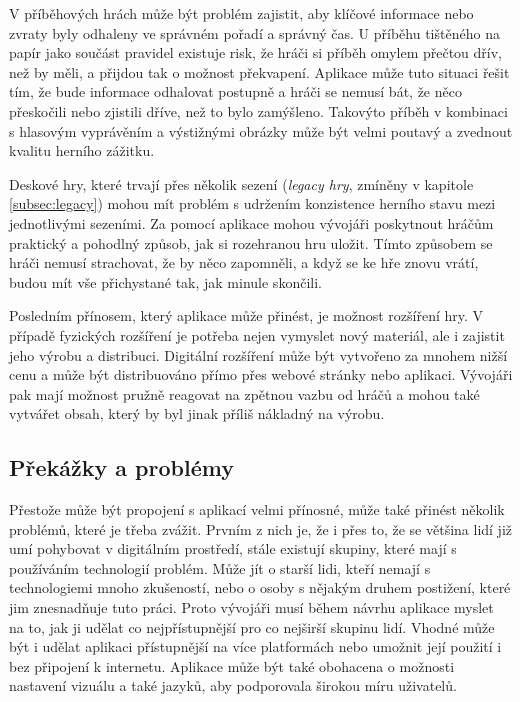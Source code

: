 V příběhových hrách může být problém zajistit, aby klíčové informace nebo zvraty byly odhaleny ve správném pořadí a správný čas. U příběhu tištěného na papír jako součást pravidel existuje risk, že hráči si příběh omylem přečtou dřív, než by měli, a přijdou tak o možnost překvapení. Aplikace může tuto situaci řešit tím, že bude informace odhalovat postupně a hráči se nemusí bát, že něco přeskočili nebo zjistili dříve, než to bylo zamýšleno. Takovýto příběh v kombinaci s hlasovým vyprávěním a výstižnými obrázky může být velmi poutavý a zvednout kvalitu herního zážitku.

Deskové hry, které trvají přes několik sezení (\textit{legacy hry}, zmíněny v kapitole \ref{subsec:legacy}) mohou mít problém s udržením konzistence herního stavu mezi jednotlivými sezeními. Za pomocí aplikace mohou vývojáři poskytnout hráčům praktický a pohodlný způsob, jak si rozehranou hru uložit. Tímto způsobem se hráči nemusí strachovat, že by něco zapomněli, a když se ke hře znovu vrátí, budou mít vše přichystané tak, jak minule skončili.

Posledním přínosem, který aplikace může přinést, je možnost rozšíření hry. V případě fyzických rozšíření je potřeba nejen vymyslet nový materiál, ale i zajistit jeho výrobu a distribuci. Digitální rozšíření může být vytvořeno za mnohem nižší cenu a může být distribuováno přímo přes webové stránky nebo aplikaci. Vývojáři pak mají možnost pružně reagovat na zpětnou vazbu od hráčů a mohou také vytvářet obsah, který by byl jinak příliš nákladný na výrobu.

\subsection{Překážky a problémy}
\label{subsec:app_problems}

Přestože může být propojení s aplikací velmi přínosné, může také přinést několik problémů, které je třeba zvážit. Prvním z nich je, že i přes to, že se většina lidí již umí pohybovat v digitálním prostředí, stále existují skupiny, které mají s používáním technologií problém. Může jít o starší lidi, kteří nemají s technologiemi mnoho zkušeností, nebo o osoby s nějakým druhem postižení, které jim znesnadňuje tuto práci. Proto vývojáři musí během návrhu aplikace myslet na to, jak ji udělat co nejpřístupnější pro co nejširší skupinu lidí. Vhodné může být i udělat aplikaci přístupnější na více platformách nebo umožnit její použití i bez připojení k internetu. Aplikace může být také obohacena o možnosti nastavení vizuálu a také jazyků, aby podporovala širokou míru uživatelů.

